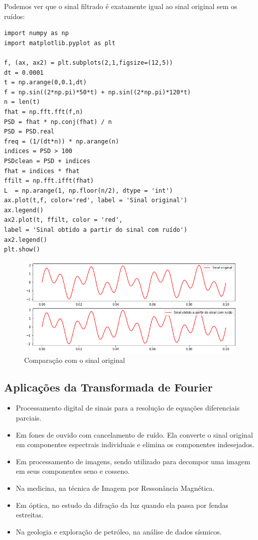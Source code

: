 Podemos ver que o sinal filtrado é exatamente igual ao sinal original sem os ruídos:

\begin{verbatim}
import numpy as np
import matplotlib.pyplot as plt

f, (ax, ax2) = plt.subplots(2,1,figsize=(12,5))
dt = 0.0001
t = np.arange(0,0.1,dt)
f = np.sin((2*np.pi)*50*t) + np.sin((2*np.pi)*120*t)
n = len(t)
fhat = np.fft.fft(f,n)
PSD = fhat * np.conj(fhat) / n
PSD = PSD.real
freq = (1/(dt*n)) * np.arange(n)
indices = PSD > 100
PSDclean = PSD + indices
fhat = indices * fhat
ffilt = np.fft.ifft(fhat)
L  = np.arange(1, np.floor(n/2), dtype = 'int')
ax.plot(t,f, color='red', label = 'Sinal original')
ax.legend()
ax2.plot(t, ffilt, color = 'red', 
label = 'Sinal obtido a partir do sinal com ruído')
ax2.legend()
plt.show()
\end{verbatim}

\begin{figure}[H]
	\centering
	\includegraphics[width=1\textwidth]{./Imagens/Transformada de Fourier/TF5.png} 
	\caption{Comparação com o sinal original}
	\label{fig:TF5}
\end{figure}

\subsection{Aplicações da Transformada de Fourier}
\begin{itemize}
\item Processamento digital de sinais para a resolução de equações diferenciais parciais.
\item Em fones de ouvido com cancelamento de ruído. Ela converte o sinal original em componentes espectrais individuais e elimina os componentes indesejados.
\item Em processamento de imagens, sendo utilizado para decompor uma imagem em seus componentes seno e cosseno.
\item Na medicina, na técnica de Imagem por Ressonância Magnética.
\item Em óptica, no estudo da difração da luz quando ela passa por fendas estreitas. 
\item Na geologia e exploração de petróleo, na análise de dados sísmicos.
\end{itemize}
